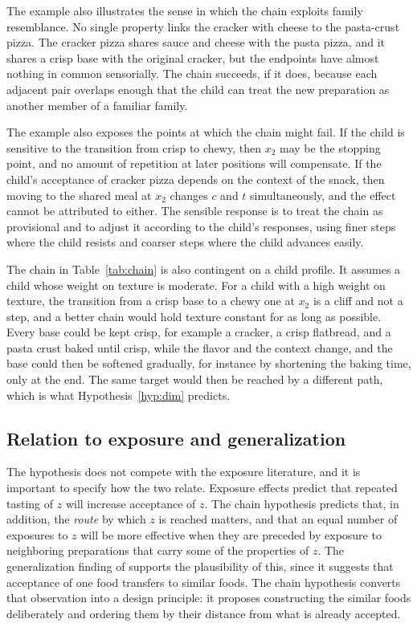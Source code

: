 \documentclass[11pt]{article}
\theoremstyle{remark}
\begin{document}
The example also illustrates the sense in which the chain exploits family resemblance. No single property links the cracker with cheese to the pasta-crust pizza. The cracker pizza shares sauce and cheese with the pasta pizza, and it shares a crisp base with the original cracker, but the endpoints have almost nothing in common sensorially. The chain succeeds, if it does, because each adjacent pair overlaps enough that the child can treat the new preparation as another member of a familiar family.

The example also exposes the points at which the chain might fail. If the child is sensitive to the transition from crisp to chewy, then $x_2$ may be the stopping point, and no amount of repetition at later positions will compensate. If the child's acceptance of cracker pizza depends on the context of the snack, then moving to the shared meal at $x_2$ changes $c$ and $t$ simultaneously, and the effect cannot be attributed to either. The sensible response is to treat the chain as provisional and to adjust it according to the child's responses, using finer steps where the child resists and coarser steps where the child advances easily.

The chain in Table~\ref{tab:chain} is also contingent on a child profile. It assumes a child whose weight on texture is moderate. For a child with a high weight on texture, the transition from a crisp base to a chewy one at $x_2$ is a cliff and not a step, and a better chain would hold texture constant for as long as possible. Every base could be kept crisp, for example a cracker, a crisp flatbread, and a pasta crust baked until crisp, while the flavor and the context change, and the base could then be softened gradually, for instance by shortening the baking time, only at the end. The same target would then be reached by a different path, which is what Hypothesis~\ref{hyp:dim} predicts.

\subsection{Relation to exposure and generalization}

The hypothesis does not compete with the exposure literature, and it is important to specify how the two relate. Exposure effects predict that repeated tasting of $z$ will increase acceptance of $z$. The chain hypothesis predicts that, in addition, the \emph{route} by which $z$ is reached matters, and that an equal number of exposures to $z$ will be more effective when they are preceded by exposure to neighboring preparations that carry some of the properties of $z$. The generalization finding of \citet{birch1998infants} supports the plausibility of this, since it suggests that acceptance of one food transfers to similar foods. The chain hypothesis converts that observation into a design principle: it proposes constructing the similar foods deliberately and ordering them by their distance from what is already accepted.
\end{document}
